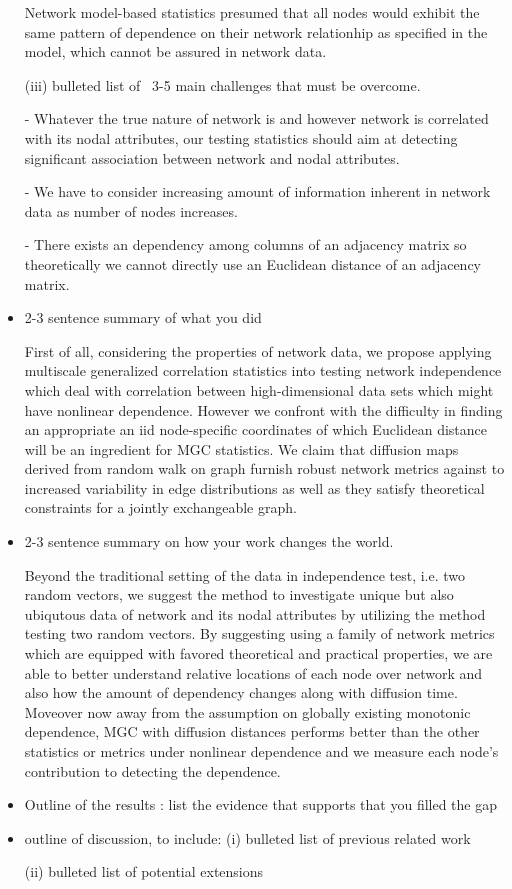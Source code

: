 \documentclass[12pt]{article}
\begin{document}
\begin{itemize}
 Network model-based statistics presumed that all nodes would exhibit the same pattern of dependence on their network relationhip as specified in the model, which cannot be assured in network data.

\subitem (iii) bulleted list of ~3-5 main challenges that must be overcome.

\subsubitem -  Whatever the true nature of network is and however network is correlated with its nodal attributes, our testing statistics should aim at detecting significant association between network and nodal attributes.

\subsubitem - We have to consider increasing amount of information inherent in network data as number of nodes increases. 

\subsubitem -  There exists an dependency among columns of an adjacency matrix so theoretically we cannot directly use an Euclidean distance of an adjacency matrix.


\item 2-3 sentence summary of what you did 

First of all, considering the properties of network data, we propose applying multiscale generalized correlation statistics into testing network independence which deal with correlation between high-dimensional data sets which might have nonlinear dependence. However we confront with the difficulty in finding an appropriate an iid node-specific coordinates of which Euclidean distance will be an ingredient for MGC statistics. We claim that diffusion maps derived from random walk on graph furnish robust network metrics against to increased variability in edge distributions as well as they satisfy theoretical constraints for a jointly exchangeable graph.


\item 2-3 sentence summary on how your work changes the world.

Beyond the traditional setting of the data in independence test, i.e. two random vectors, we suggest the method to investigate unique but also ubiqutous data of network and its nodal attributes by utilizing the method testing two random vectors. By suggesting using a family of network metrics which are equipped with favored theoretical and practical properties, we are able to better understand relative locations of each node over network and also how the amount of dependency changes along with diffusion time. Moveover now away from the assumption on globally existing monotonic dependence, MGC with diffusion distances performs better than the other statistics or metrics under nonlinear dependence and we measure each node's contribution to detecting the dependence.



\item  Outline of the results : list the evidence that supports that you filled the gap



\item  outline of discussion, to include:
\subitem (i) bulleted list of previous related work


\subitem (ii) bulleted list of potential extensions 


\end{itemize}
\end{document}
